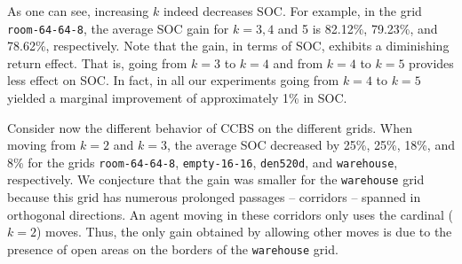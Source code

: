 \documentclass[review]{elsarticle}
\newcommand\konstantin[1]{\nb{\textbf{Konstantin:}}{red}{#1}}
\newcommand\roni[1]{\nb{\textbf{Roni:}}{green}{#1}}
\newcommand{\ccbs}{\ac{CCBS}\xspace}
\begin{document}

As one can see, increasing $k$ indeed decreases SOC. 
For example, in the grid \texttt{room-64-64-8}, the average SOC gain for $k=3, 4$ and 5 is 82.12\%, 79.23\%, and 78.62\%, respectively. %
Note that the gain, in terms of SOC, exhibits a diminishing return effect. That is, going from $k=3$ to $k=4$ and from $k=4$ to $k=5$ provides less effect on SOC. In fact, in all our experiments going from $k=4$ to $k=5$ yielded a marginal improvement of approximately 1\% in SOC. %



Consider now the different behavior of \ccbs on the different grids. 
When moving from $k=2$ and $k=3$, 
the average SOC decreased by 25\%, 25\%, 18\%, and 8\% for the grids \texttt{room-64-64-8}, \texttt{empty-16-16}, \texttt{den520d}, and \texttt{warehouse}, respectively. 
We conjecture that the gain was smaller for the \texttt{warehouse} grid because this grid has numerous prolonged passages -- corridors -- spanned in orthogonal directions. An agent moving in these corridors only uses the cardinal ($k=2$) moves. Thus, the only gain obtained by allowing other moves is due to the presence of open areas on the borders of the \texttt{warehouse} grid. 
\end{document}
